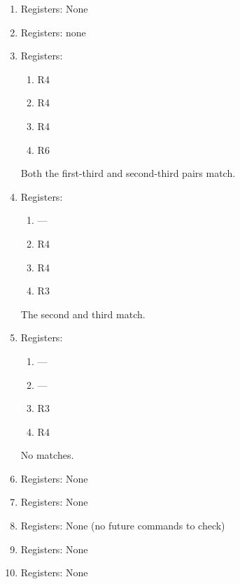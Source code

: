 \documentclass[12pt,letterpaper]{hmcpset}
\begin{document}
\begin{solution}
\begin{enumerate}[label=Cycle \arabic*]
\item
Registers: None

\item
Registers: none

\item
Registers:
\begin{enumerate}
\item R4
\item R4
\item R4
\item R6
\end{enumerate}
Both the first-third and second-third pairs match.

\item
Registers:
\begin{enumerate}
\item ---
\item R4
\item R4
\item R3
\end{enumerate}
The second and third match.

\item
Registers:
\begin{enumerate}
\item ---
\item ---
\item R3
\item R4
\end{enumerate}
No matches.

\item
Registers: None

\item
Registers: None

\item
Registers: None (no future commands to check)

\item
Registers: None

\item
Registers: None
\end{enumerate}


\end{solution}
\end{document}

